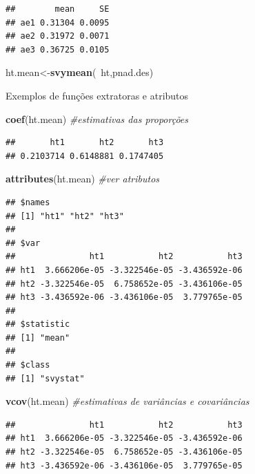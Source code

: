\documentclass[]{book}
\newenvironment{Shaded}{\begin{snugshade}}{\end{snugshade}}
\newcommand{\KeywordTok}[1]{\textcolor[rgb]{0.13,0.29,0.53}{\textbf{{#1}}}}
\newcommand{\CommentTok}[1]{\textcolor[rgb]{0.56,0.35,0.01}{\textit{{#1}}}}
\newcommand{\NormalTok}[1]{{#1}}
\numberwithin{example}{chapter}
\numberwithin{remark}{chapter}
\numberwithin{definition}{chapter}
\begin{document}
\begin{verbatim}
##        mean     SE
## ae1 0.31304 0.0095
## ae2 0.31972 0.0071
## ae3 0.36725 0.0105
\end{verbatim}

\begin{Shaded}
\begin{Highlighting}[]
\NormalTok{ht.mean<-}\KeywordTok{svymean}\NormalTok{(~ht,pnad.des)}
\end{Highlighting}
\end{Shaded}

Exemplos de funções extratoras e atributos

\begin{Shaded}
\begin{Highlighting}[]
\KeywordTok{coef}\NormalTok{(ht.mean)                         }\CommentTok{#estimativas das proporções}
\end{Highlighting}
\end{Shaded}

\begin{verbatim}
##       ht1       ht2       ht3 
## 0.2103714 0.6148881 0.1747405
\end{verbatim}

\begin{Shaded}
\begin{Highlighting}[]
\KeywordTok{attributes}\NormalTok{(ht.mean)                          }\CommentTok{#ver atributos}
\end{Highlighting}
\end{Shaded}

\begin{verbatim}
## $names
## [1] "ht1" "ht2" "ht3"
## 
## $var
##               ht1           ht2           ht3
## ht1  3.666206e-05 -3.322546e-05 -3.436592e-06
## ht2 -3.322546e-05  6.758652e-05 -3.436106e-05
## ht3 -3.436592e-06 -3.436106e-05  3.779765e-05
## 
## $statistic
## [1] "mean"
## 
## $class
## [1] "svystat"
\end{verbatim}

\begin{Shaded}
\begin{Highlighting}[]
\KeywordTok{vcov}\NormalTok{(ht.mean)                         }\CommentTok{#estimativas de variâncias e covariâncias}
\end{Highlighting}
\end{Shaded}

\begin{verbatim}
##               ht1           ht2           ht3
## ht1  3.666206e-05 -3.322546e-05 -3.436592e-06
## ht2 -3.322546e-05  6.758652e-05 -3.436106e-05
## ht3 -3.436592e-06 -3.436106e-05  3.779765e-05
\end{verbatim}
\end{document}
